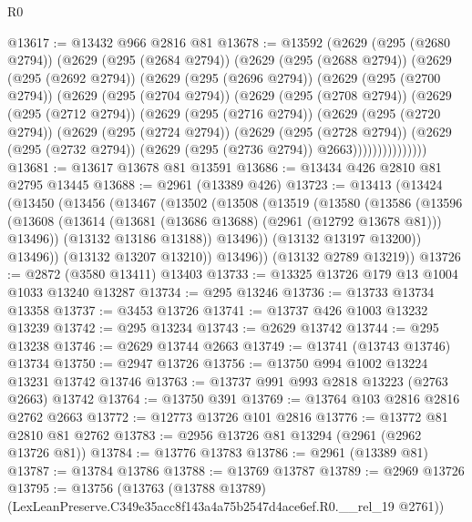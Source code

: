 \begin{lexlean}{R0}
\begin{coremodule}
@13617 := @13432 @966 @2816 @81
@13678 := @13592
    (@2629
      (@295 (@2680 @2794))
      (@2629
        (@295 (@2684 @2794))
        (@2629
          (@295 (@2688 @2794))
          (@2629
            (@295 (@2692 @2794))
            (@2629
              (@295 (@2696 @2794))
              (@2629
                (@295 (@2700 @2794))
                (@2629
                  (@295 (@2704 @2794))
                  (@2629
                    (@295 (@2708 @2794))
                    (@2629
                      (@295 (@2712 @2794))
                      (@2629
                        (@295 (@2716 @2794))
                        (@2629
                          (@295 (@2720 @2794))
                          (@2629
                            (@295 (@2724 @2794))
                            (@2629
                              (@295 (@2728 @2794))
                              (@2629
                                (@295 (@2732 @2794))
                                (@2629 (@295 (@2736 @2794)) @2663)))))))))))))))
@13681 := @13617 @13678 @81 @13591
@13686 := @13434 @426 @2810 @81 @2795 @13445
@13688 := @2961 (@13389 @426)
@13723 := @13413
    (@13424
      (@13450
        (@13456
          (@13467
            (@13502
              (@13508
                (@13519
                  (@13580
                    (@13586
                      (@13596
                        (@13608
                          (@13614 (@13681 (@13686 @13688) (@2961 (@12792 @13678 @81))) @13496))
                        (@13132 @13186 @13188))
                      @13496))
                  (@13132 @13197 @13200))
                @13496))
            (@13132 @13207 @13210))
          @13496))
      (@13132 @2789 @13219))
@13726 := @2872 (@3580 @13411) @13403
@13733 := @13325 @13726 @179 @13 @1004 @1033 @13240 @13287
@13734 := @295 @13246
@13736 := @13733 @13734 @13358
@13737 := @3453 @13726
@13741 := @13737 @426 @1003 @13232 @13239
@13742 := @295 @13234
@13743 := @2629 @13742
@13744 := @295 @13238
@13746 := @2629 @13744 @2663
@13749 := @13741 (@13743 @13746) @13734
@13750 := @2947 @13726
@13756 := @13750 @994 @1002 @13224 @13231 @13742 @13746
@13763 := @13737 @991 @993 @2818 @13223 (@2763 @2663) @13742
@13764 := @13750 @391
@13769 := @13764 @103 @2816 @2816 @2762 @2663
@13772 := @12773 @13726 @101 @2816
@13776 := @13772 @81 @2810 @81 @2762
@13783 := @2956 @13726 @81 @13294 (@2961 (@2962 @13726 @81))
@13784 := @13776 @13783
@13786 := @2961 (@13389 @81)
@13787 := @13784 @13786
@13788 := @13769 @13787
@13789 := @2969 @13726
@13795 := @13756
    (@13763 (@13788 @13789) (LexLeanPreserve.C349e35acc8f143a4a75b2547d4ace6ef.R0.__rel_19 @2761))

\end{coremodule}
\end{lexlean}
